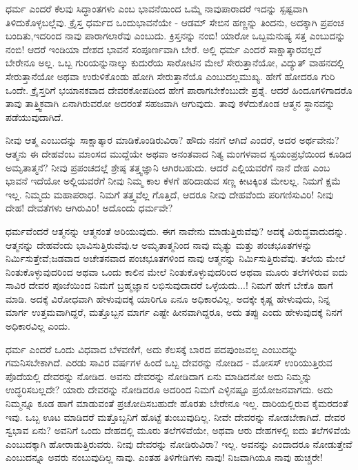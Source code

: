 ಧರ್ಮ ಎಂದರೆ ಕೆಲವು ಸಿದ್ಧಾಂತಗಳು ಎಂಬ ಭಾವನೆಯಿಂದ ಒಮ್ಮೆ ನಾವು\break ಪಾರಾದರೆ ಇದನ್ನು ಸ್ಪಷ್ಟವಾಗಿ ತಿಳಿದುಕೊಳ್ಳಬಲ್ಲೆವು. ಕ್ರೈಸ್ತ ಧರ್ಮದ ಒಂದು\break ಭಾವನೆಯೇ - ಆಡಮ್​ ಸೇಬಿನ ಹಣ್ಣನ್ನು ತಿಂದನು, ಅದಕ್ಕಾಗಿ ಪ್ರಪಂಚ ಬಂದಿತು,\break ಇದರಿಂದ ನಾವು ಪಾರಾಗಲಾರೆವು ಎಂಬುದು. ಕ್ರಿಸ್ತನನ್ನು ನಂಬಿ! ಯಾರೋ ಒಬ್ಬ\break ಮನುಷ್ಯ ಸತ್ತ ಎಂಬುದನ್ನು ನಂಬಿ! ಆದರೆ ಇಂಡಿಯಾ ದೇಶದ ಭಾವನೆ ಸಂಪೂರ್ಣವಾಗಿ ಬೇರೆ. ಅಲ್ಲಿ ಧರ್ಮ ಎಂದರೆ ಸಾಕ್ಷಾತ್ಕಾರವಲ್ಲದೆ ಬೇರೇನೂ ಅಲ್ಲ. ಒಬ್ಬ ಗುರಿಯನ್ನು\break ನಾಲ್ಕು ಕುದುರೆಯ ಸಾರೋಟಿನ ಮೇಲೆ ಸೇರುತ್ತಾನೆಯೋ, ವಿದ್ಯುತ್​ ವಾಹನದಲ್ಲಿ ಸೇರುತ್ತಾನೆಯೋ ಅಥವಾ ಉರುಳಿಕೊಂಡು ಹೋಗಿ ಸೇರುತ್ತಾನೆಯೊ ಎಂಬುದಲ್ಲ\break ಮುಖ್ಯ. ಹೇಗೆ ಹೋದರೂ ಗುರಿ ಒಂದೇ. ಕ್ರೈಸ್ತರಿಗೆ ಭಯಾನಕವಾದ ದೇವರ\break ಕೋಪದಿಂದ ಹೇಗೆ ಪಾರಾಗಬೇಕೆಂಬುದೇ ಪ್ರಶ್ನೆ. ಆದರೆ ಹಿಂದೂಗಳಿಗಾದರೊ ತಾವು ತಾತ್ತ್ವಿಕವಾಗಿ ಏನಾಗಿರುವರೋ ಅದರಂತೆ ಸಹಜವಾಗಿ ಆಗುವುದು. ತಾವು ಕಳೆದುಕೊಂಡ ಆತ್ಮನ ಸ್ಥಾನವನ್ನು ಪಡೆಯುವುದಾಗಿದೆ.

ನೀವು ಆತ್ಮ ಎಂಬುದನ್ನು ಸಾಕ್ಷಾತ್ಕಾರ ಮಾಡಿಕೊಂಡಿರುವಿರಾ? ಹೌದು ನನಗೆ ಆಗಿದೆ ಎಂದರೆ, ಅದರ ಅರ್ಥವೇನು? ಆತ್ಮನು ಈ ದೇಹವೆಂಬ ಮಾಂಸದ ಮುದ್ದೆಯೇ ಅಥವಾ ಅನಂತವಾದ ನಿತ್ಯ ಮಂಗಳವಾದ ಸ್ವಯಂಪ್ರಭೆಯಿಂದ ಕೂಡಿದ ಅಮೃತಾತ್ಮನೆ? ನೀವು ಪ್ರಪಂಚದಲ್ಲೆ ಶ್ರೇಷ್ಠ ತತ್ತ್ವಜ್ಞಾನಿ ಆಗಿರಬಹುದು. ಆದರೆ ಎಲ್ಲಿಯವರೆಗೆ ನಾನೆ ದೇಹ ಎಂಬ ಭಾವನೆ ಇದೆಯೋ ಅಲ್ಲಿಯವರೆಗೆ ನೀವು ನಿಮ್ಮ ಕಾಲ ಕೆಳಗೆ ಹರಿದಾಡುವ ಸಣ್ಣ ಕೀಟಕ್ಕಿಂತ ಮೇಲಲ್ಲ. ನಿಮಗೆ ಕ್ಷಮೆ ಇಲ್ಲ. ನಿಮ್ಮದು ಮಹಾಪರಾಧ. ನಿಮಗೆ ತತ್ತ್ವವೆಲ್ಲ ಗೊತ್ತಿದೆ, ಆದರೂ ನೀವು ದೇಹವೆಂದು ಪರಿಗಣಿಸುವಿರಿ! ನೀವು ದೇಹ! ದೇವತೆಗಳು ಆಗಿರುವಿರಿ! ಅದೊಂದು ಧರ್ಮವೇ?

ಧರ್ಮವೆಂದರೆ ಆತ್ಮನನ್ನು ಆತ್ಮನಂತೆ ಅರಿಯುವುದು. ಈಗ ನಾವೇನು ಮಾಡುತ್ತಿರುವೆವು? ಅದಕ್ಕೆ ವಿರುದ್ಧವಾದುದನ್ನು. ಆತ್ಮನನ್ನು ದೇಹವೆಂದು ಭಾವಿಸುತ್ತಿರುವೆವು.\break ಆ ಅಮೃತಾತ್ಮನಿಂದ ನಾವು ಮೃತ್ಯು ಮತ್ತು ಪಂಚಭೂತಗಳನ್ನು ನಿರ್ಮಿಸುತ್ತೇವೆ;\break ಜಡವಾದ ಅಚೇತನವಾದ ಪಂಚಭೂತಗಳಿಂದ ನಾವು ಆತ್ಮನನ್ನು ನಿರ್ಮಿಸುತ್ತಿರುವೆವು. ತಲೆಯ ಮೇಲೆ ನಿಂತುಕೊಳ್ಳುವುದರಿಂದ ಅಥವಾ ಒಂದು ಕಾಲಿನ ಮೇಲೆ ನಿಂತುಕೊಳ್ಳುವುದರಿಂದ ಅಥವಾ ಮೂರು ತಲೆಗಳಿರುವ ಐದು ಸಾವಿರ ದೇವರ ಪೂಜೆಯಿಂದ ನಿಮಗೆ ಬ್ರಹ್ಮಜ್ಞಾನ ಲಭಿಸುವುದಾದರೆ ಒಳ್ಳೆಯದು...! ನಿಮಗೆ ಹೇಗೆ ಬೇಕೊ ಹಾಗೆ ಮಾಡಿ. ಅದಕ್ಕೆ ವಿರೋಧವಾಗಿ ಹೇಳುವುದಕ್ಕೆ ಯಾರಿಗೂ ಏನೂ ಅಧಿಕಾರವಿಲ್ಲ. ಅದಕ್ಕೇ ಕೃಷ್ಣ ಹೇಳುವುದು, ನಿನ್ನ ಮಾರ್ಗ ಉತ್ತಮವಾಗಿದ್ದರೆ, ಮತ್ತೊಬ್ಬನ ಮಾರ್ಗ ಎಷ್ಟೇ ಹೀನವಾಗಿದ್ದರೂ, ಅದು ತಪ್ಪು ಎಂದು ಹೇಳುವುದಕ್ಕೆ ನಿನಗೆ ಅಧಿಕಾರವಿಲ್ಲ ಎಂದು.

ಧರ್ಮ ಎಂದರೆ ಒಂದು ವಿಧವಾದ ಬೆಳವಣಿಗೆ, ಅದು ಕೆಲಸಕ್ಕೆ ಬಾರದ ಪದಪುಂಜವಲ್ಲ ಎಂಬುದನ್ನು ಗಮನಿಸಬೇಕಾಗಿದೆ. ಎರಡು ಸಾವಿರ ವರ್ಷಗಳ ಹಿಂದೆ ಒಬ್ಬ ದೇವರನ್ನು ನೋಡಿದ - ಮೋಸಸ್​ ಉರಿಯುತ್ತಿರುವ ಪೊದೆಯಲ್ಲಿ ದೇವರನ್ನು ನೋಡಿದ. ಅವನು ದೇವರನ್ನು ನೋಡಿದಾಗ ಏನು ಮಾಡಿದನೋ ಅದು ನಿಮ್ಮನ್ನು ಉದ್ಧರಿಸಬಲ್ಲದೇ? ಯಾರು ದೇವರನ್ನು ನೋಡಿದರೂ ಅದರಿಂದ ನಿಮಗೆ ಎಳ್ಳಿನಷ್ಟೂ ಪ್ರಯೋಜನವಾಗದು. ಅದು ನಿಮ್ಮನ್ನೂ ಕೂಡ ಹಾಗೆ ಮಾಡುವಂತೆ ಪ್ರಚೋದಿಸಬಹುದೇ ಹೊರತು ಬೇರೇನೂ ಇಲ್ಲ. ದಾರಿಯಲ್ಲಿರುವ ಕೈಮರದಂತೆ ಇವು. ಒಬ್ಬ ಊಟ ಮಾಡಿದರೆ ಮತ್ತೊಬ್ಬನಿಗೆ ಹೊಟ್ಟೆ ತುಂಬುವುದಿಲ್ಲ. ನೀವೇ ದೇವರನ್ನು ನೋಡಬೇಕಾಗಿದೆ. ದೇವರ ಸ್ವಭಾವ ಏನು? ಅವನಿಗೆ ಒಂದು ದೇಹದಲ್ಲಿ ಮೂರು ತಲೆಗಳಿವೆಯೇ, ಅಥವಾ ಆರು ದೇಹಗಳಲ್ಲಿ ಐದು ತಲೆಗಳಿವೆಯೆ ಎಂಬುದಕ್ಕಾಗಿ ಹೋರಾಡುತ್ತಿರುವರು. ನೀವು ದೇವರನ್ನು ನೋಡಿರುವಿರಾ? ಇಲ್ಲ. ಅವನನ್ನು ಎಂದಾದರೂ ನೋಡುತ್ತೇವೆ ಎಂಬುದನ್ನೂ ಅವರು ನಂಬುವುದಿಲ್ಲ ನಾವು. ಎಂತಹ ತಿಳಿಗೇಡಿಗಳು ನಾವು! ನಿಜವಾಗಿಯೂ ನಾವು ಹುಚ್ಚರೇ!

